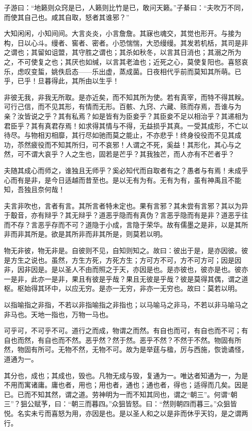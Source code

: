\documentclass[a4paper,12pt,UTF8,twoside]{ctexbook}
\begin{document}
子游曰：“地籁则众窍是已，人籁则比竹是已，敢问天籁。”子綦曰：“夫吹万不同，而使其自己也。咸其自取，怒者其谁邪？”

大知闲闲，小知间间。大言炎炎，小言詹詹。其寐也魂交，其觉也形开。与接为构，日以心斗。缦者、窖者、密者。小恐惴惴，大恐缦缦。其发若机栝，其司是非之谓也；其留如诅盟，其守胜之谓也；其杀如秋冬，以言其日消也；其溺之所为之，不可使复之也；其厌也如缄，以言其老洫也；近死之心，莫使复阳也。喜怒哀乐，虑叹变蜇，姚佚启态——乐出虚，蒸成菌。日夜相代乎前而莫知其所萌。已乎，已乎！旦暮得此，其所由以生乎！

非彼无我，非我无所取。是亦近矣，而不知其所为使。若有真宰，而特不得其眹。可行己信，而不见其形，有情而无形。百骸、九窍、六藏、赅而存焉，吾谁与为亲？汝皆说之乎？其有私焉？如是皆有为臣妾乎？其臣妾不足以相治乎？其递相为君臣乎？其有真君存焉！如求得其情与不得，无益损乎其真。一受其成形，不亡以待尽。与物相刃相靡，其行尽如驰而莫之能止，不亦悲乎！终身役役而不见其成功，苶然疲役而不知其所归，可不哀邪！人谓之不死，奚益！其形化，其心与之然，可不谓大哀乎？人之生也，固若是芒乎？其我独芒，而人亦有不芒者乎？

夫随其成心而师之，谁独且无师乎？奚必知代而自取者有之？愚者与有焉！未成乎心而有是非，是今日适越而昔至也。是以无有为有。无有为有，虽有神禹且不能知，吾独且奈何哉！

夫言非吹也，言者有言。其所言者特未定也。果有言邪？其未尝有言邪？其以为异于鷇音，亦有辩乎？其无辩乎？道恶乎隐而有真伪？言恶乎隐而有是非？道恶乎往而不存？言恶乎存而不可？道隐于小成，言隐于荣华。故有儒墨之是非，以是其所非而非其所是。欲是其所非而非其所是，则莫若以明。

物无非彼，物无非是。自彼则不见，自知则知之。故曰：彼出于是，是亦因彼。彼是方生之说也。虽然，方生方死，方死方生；方可方不可，方不可方可；因是因非，因非因是。是以圣人不由而照之于天，亦因是也。是亦彼也，彼亦是也。彼亦一是非，此亦一是非，果且有彼是乎哉？果且无彼是乎哉？彼是莫得其偶，谓之道枢。枢始得其环中，以应无穷。是亦一无穷，非亦一无穷也。故曰：莫若以明。

以指喻指之非指，不若以非指喻指之非指也；以马喻马之非马，不若以非马喻马之非马也。天地一指也，万物一马也。

可乎可，不可乎不可。道行之而成，物谓之而然。有自也而可，有自也而不可；有自也而然，有自也而不然。恶乎然？然于然。恶乎不然？不然于不然。物固有所然，物固有所可。无物不然，无物不可。故为是举莛与楹，厉与西施，恢诡谲怪，道通为一。

其分也，成也；其成也，毁也。凡物无成与毁，复通为一。唯达者知通为一，为是不用而寓诸庸。庸也者，用也；用也者，通也；通也者，得也；适得而几矣。因是已。已而不知其然，谓之道。劳神明为一而不知其同也，谓之“朝三”。何谓“朝三”？狙公赋芧，曰：“朝三而暮四。”众狙皆怒。曰：“然则朝四而暮三。”众狙皆悦。名实未亏而喜怒为用，亦因是也。是以圣人和之以是非而休乎天钧，是之谓两行。
\end{document}
